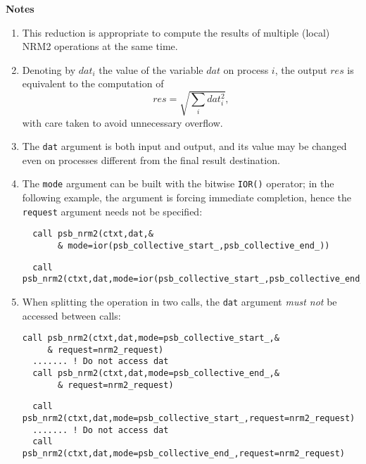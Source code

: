 {\par\noindent\large\bfseries Notes}
\begin{enumerate}
\item This reduction is appropriate to compute the results of multiple
  (local) NRM2 operations at the same time. 
\item Denoting by $dat_i$ the value of the variable $dat$ on process
  $i$, the output $res$ is equivalent to the computation of
  \[ res = \sqrt{\sum_i dat_i^2},\]
  with care taken to avoid unnecessary overflow.
\item The \verb|dat| argument is both input and output, and its
  value may be changed even on processes different from the final
  result destination.
\item The \verb|mode| argument can be built with the bitwise
  \verb|IOR()| operator; in the following example, the   argument is
  forcing immediate completion, hence the \verb|request| argument
  needs not be specified: 
\ifpdf
\begin{verbatim}
  call psb_nrm2(ctxt,dat,&
       & mode=ior(psb_collective_start_,psb_collective_end_))
\end{verbatim}
\else
\begin{center}
    \begin{minipage}[tl]{0.9\textwidth}
\begin{verbatim} 
  call psb_nrm2(ctxt,dat,mode=ior(psb_collective_start_,psb_collective_end_))
\end{verbatim}
    \end{minipage}
  \end{center}
\fi
  
\item When splitting the operation in two calls, the \verb|dat|
  argument  \emph{must not} be accessed between calls:
\ifpdf
\begin{verbatim}
call psb_nrm2(ctxt,dat,mode=psb_collective_start_,&
     & request=nrm2_request)
  ....... ! Do not access dat 
  call psb_nrm2(ctxt,dat,mode=psb_collective_end_,&
       & request=nrm2_request)
\end{verbatim}
\else
\begin{center}
    \begin{minipage}[tl]{0.9\textwidth}
\begin{verbatim} 
  call psb_nrm2(ctxt,dat,mode=psb_collective_start_,request=nrm2_request)
  ....... ! Do not access dat 
  call psb_nrm2(ctxt,dat,mode=psb_collective_end_,request=nrm2_request)
\end{verbatim}
    \end{minipage}
  \end{center}
\fi
\end{enumerate}



